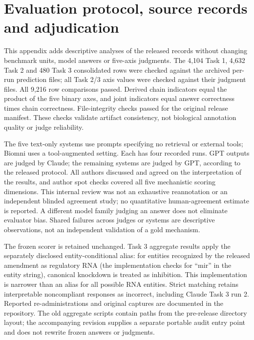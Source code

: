 \section{Evaluation protocol, source records and adjudication}\label{app:protocol}
This appendix adds descriptive analyses of the released records without changing benchmark units, model answers or five-axis judgments. The 4,104 Task 1, 4,632 Task 2 and 480 Task 3 consolidated rows were checked against the archived per-run prediction files; all Task 2/3 axis values were checked against their judgment files. All 9,216 row comparisons passed. Derived chain indicators equal the product of the five binary axes, and joint indicators equal answer correctness times chain correctness. File-integrity checks passed for the original release manifest. These checks validate artifact consistency, not biological annotation quality or judge reliability.

The five text-only systems use prompts specifying no retrieval or external tools; Biomni uses a tool-augmented setting. Each has four recorded runs. GPT outputs are judged by Claude; the remaining systems are judged by GPT, according to the released protocol. All authors discussed and agreed on the interpretation of the results, and author spot checks covered all five mechanistic scoring dimensions. This internal review was not an exhaustive reannotation or an independent blinded agreement study; no quantitative human-agreement estimate is reported. A different model family judging an answer does not eliminate evaluator bias. Shared failures across judges or systems are descriptive observations, not an independent validation of a gold mechanism.

The frozen scorer is retained unchanged. Task 3 aggregate results apply the separately disclosed entity-conditional alias: for entities recognized by the released amendment as regulatory RNA (the implementation checks for ``mir'' in the entity string), canonical knockdown is treated as inhibition. This implementation is narrower than an alias for all possible RNA entities. Strict matching retains interpretable noncompliant responses as incorrect, including Claude Task 3 run 2. Reported re-administrations and original captures are documented in the repository. The old aggregate scripts contain paths from the pre-release directory layout; the accompanying revision supplies a separate portable audit entry point and does not rewrite frozen answers or judgments.

